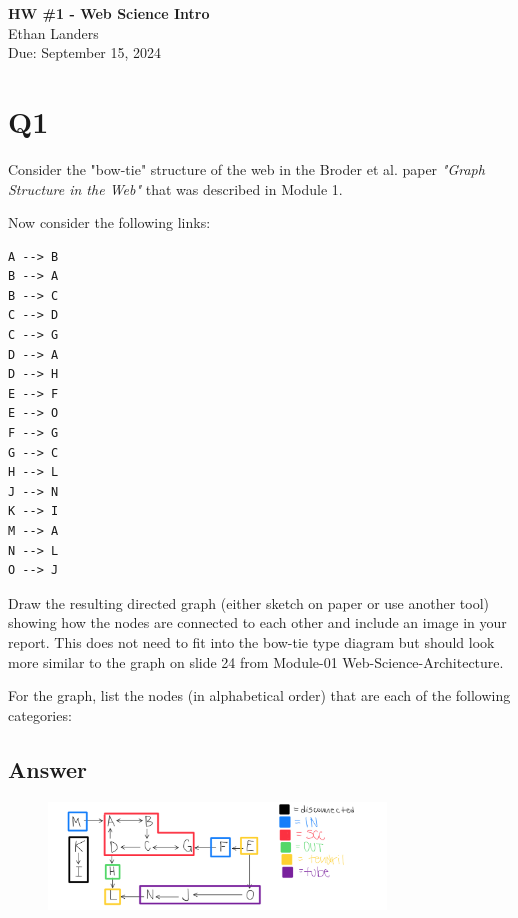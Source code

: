 \documentclass[12pt]{article}
\begin{document}
\begin{centering}
{\large\textbf{HW \#1 - Web Science Intro}}\\ 
Ethan Landers\\
Due: September 15, 2024\\
\end{centering}


\section*{Q1}

Consider the "bow-tie" structure of the web in the Broder et al. paper \textit{"Graph Structure in the Web"} that was described in Module 1.

Now consider the following links:

\begin{verbatim}
A --> B
B --> A
B --> C
C --> D
C --> G
D --> A
D --> H
E --> F
E --> O
F --> G
G --> C
H --> L
J --> N
K --> I
M --> A
N --> L
O --> J    
\end{verbatim}

Draw the resulting directed graph (either sketch on paper or use another tool) showing how the nodes are connected to each other and include an image in your report. This does not need to fit into the bow-tie type diagram but should look more similar to the graph on slide 24 from Module-01 Web-Science-Architecture.

For the graph, list the nodes (in alphabetical order) that are each of the following categories:

\clearpage

\subsection*{Answer}

\begin{figure}[h!]
    \centering
    \includegraphics[width=0.8\textwidth] {q1.png}
    \label{fig:directed-graph}
\end{figure}
\end{document}
